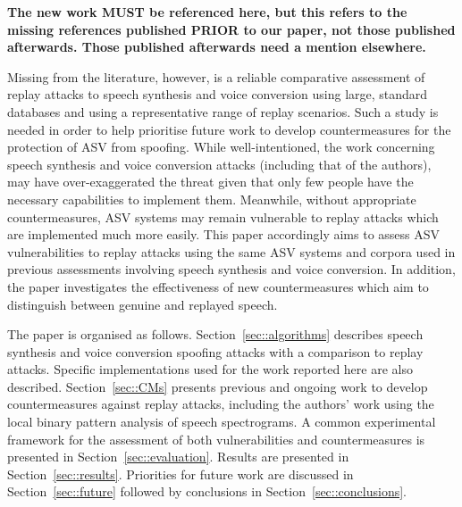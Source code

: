 {\bfseries The new work MUST be referenced here, but this refers to the missing references published PRIOR to our paper, not those published afterwards.  Those published afterwards need a mention elsewhere.}


Missing from the literature, however, is a reliable comparative assessment 
of replay attacks to speech synthesis and voice conversion using large, 
standard databases and using a representative range of replay scenarios. 
Such a study is needed in order to help prioritise future work to develop
countermeasures for the protection of ASV from spoofing.
While well-intentioned, the work concerning speech synthesis and voice conversion attacks 
(including that of the authors), may have over-exaggerated the threat given that
only few people have the necessary capabilities to implement them.  Meanwhile, 
without appropriate countermeasures, ASV systems may remain vulnerable to replay 
attacks which are implemented much more easily. 
This paper accordingly aims to assess ASV vulnerabilities 
to replay attacks using the same ASV systems and corpora used in 
previous assessments involving speech synthesis and voice conversion.  In addition, the paper investigates the effectiveness of 
new countermeasures which aim to distinguish between genuine and replayed speech. 


The paper is organised as follows.  Section~\ref{sec::algorithms} describes speech synthesis and voice conversion spoofing attacks with a comparison to replay attacks. Specific implementations used for the work reported here are also described. Section~\ref{sec::CMs} presents previous and ongoing work to develop countermeasures against replay attacks, including the authors' work using the local binary pattern analysis of speech spectrograms.  A common experimental framework for the assessment of both vulnerabilities and countermeasures is presented in Section~\ref{sec::evaluation}. Results are presented in Section~\ref{sec::results}.  Priorities for future work are discussed in Section~\ref{sec::future} followed by conclusions in Section~\ref{sec::conclusions}.
